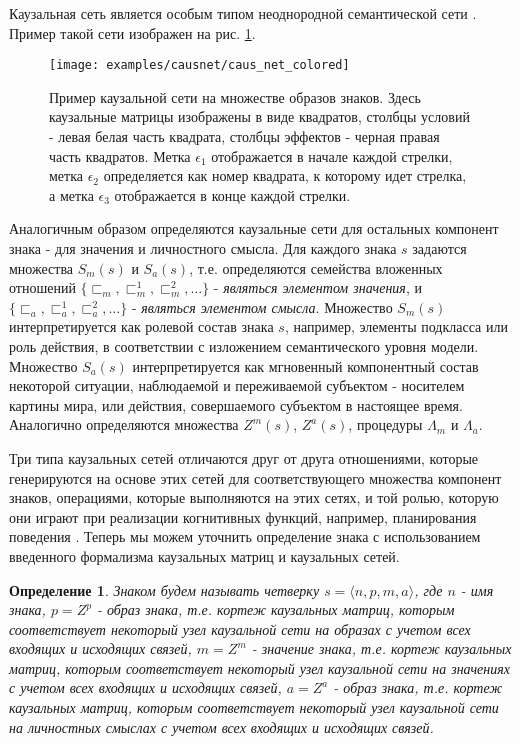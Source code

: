 \documentclass[12pt]{scrartcl}
\newtheorem{definition}{Определение}
\begin{document}
	Каузальная сеть является особым типом неоднородной семантической сети \cite{Osipov1990}. Пример такой сети изображен на рис. \ref{fig:caus_net}.

	\begin{figure}[h]
		\centering
		\texttt{[image: examples/causnet/caus\_net\_colored]}
		\caption{Пример каузальной сети на множестве образов знаков. Здесь каузальные матрицы изображены в виде квадратов, столбцы условий - левая белая часть квадрата, столбцы эффектов - черная правая часть квадратов. Метка $\epsilon_1$ отображается в начале каждой стрелки, метка $\epsilon_2$ определяется как номер квадрата, к которому идет стрелка, а метка $\epsilon_3$ отображается в конце каждой стрелки.}
		\label{fig:caus_net}		
	\end{figure}
		
	Аналогичным образом определяются каузальные сети для остальных компонент знака - для значения и личностного смысла. Для каждого знака $s$ задаются множества $S_m(s)$ и $S_a(s)$, т.е. определяются семейства вложенных отношений $\{\sqsubset_m,\sqsubset_m^1,\sqsubset_m^2,\dots\}$ - \textit{являться элементом значения}, и $\{\sqsubset_a,\sqsubset_a^1,\sqsubset_a^2,\dots\}$ - \textit{являться элементом смысла}. Множество $S_m(s)$ интерпретируется как ролевой состав знака $s$, например, элементы подкласса или роль действия, в соответствии с изложением семантического уровня модели. Множество $S_a(s)$ интерпретируется как мгновенный компонентный состав некоторой ситуации, наблюдаемой и переживаемой субъектом - носителем картины мира, или действия, совершаемого субъектом в настоящее время. Аналогично определяются множества $Z^m(s)$, $Z^a(s)$, процедуры $\Lambda_m$ и $\Lambda_a$.
	
	Три типа каузальных сетей отличаются друг от друга отношениями, которые генерируются на основе этих сетей для соответствующего множества компонент знаков, операциями, которые выполняются на этих сетях, и той ролью, которую они играют при реализации когнитивных функций, например, планирования поведения \cite{Osipov2015d,Panov2017a}. Теперь мы можем уточнить определение знака \cite{Osipov2015c} с использованием введенного формализма каузальных матриц и каузальных сетей.
	
	\begin{definition}
		Знаком будем называть четверку $s=\langle n, p, m, a \rangle$, где $n$ - имя знака, $p=Z^p$ - образ знака, т.е. кортеж каузальных матриц, которым соответствует некоторый узел каузальной сети на образах с учетом всех входящих и исходящих связей, $m=Z^m$ - значение знака, т.е. кортеж каузальных матриц, которым соответствует некоторый узел каузальной сети на значениях  с учетом всех входящих и исходящих связей, $a=Z^a$ - образ знака, т.е. кортеж каузальных матриц, которым соответствует некоторый узел каузальной сети на личностных смыслах  с учетом всех входящих и исходящих связей.
	\end{definition}
	
\end{document}
